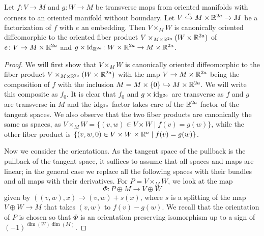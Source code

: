 \begin{lemma}
	Let $f \colon V \to M$ and $g \colon W \to M$ be transverse maps from oriented manifolds with corners to an oriented manifold without boundary.
	Let $V\xhookrightarrow{e}M \times \mathbb{R}^{2a} \to M$ be a factorization of $f$ with $e$ an embedding.
	Then $V \times_M W$ is canonically oriented diffeomorphic to the oriented fiber product $V\times_{M \times \mathbb{R}^{2a}} (W \times \mathbb{R}^{2a})$ of $e \colon V \to M \times \mathbb{R}^{2a}$ and $g \times \mathrm{id}_{\mathbb{R}^{2a}} \colon W \times \mathbb{R}^{2a} \to M \times \mathbb{R}^{2a}$.
\end{lemma}
\begin{proof}
	We will first show that $V \times_M W$ is canonically oriented diffeomorphic to the fiber product $V\times_{M \times \mathbb{R}^{2a}} (W \times \mathbb{R}^{2a})$ with the map $V \to M \times \mathbb{R}^{2a}$ being the composition of $f$ with the inclusion $M = M \times \{0\} \hookrightarrow M \times \mathbb{R}^{2a}$.
	We will write this composite as $f_0$.
	It is clear that $f_0$ and $g \times \mathrm{id}_{\mathbb{R}^{2a}}$ are transverse as $f$ and $g$ are transverse in $M$ and the $\mathrm{id}_{\mathbb{R}^{2a}}$ factor takes care of the $\mathbb{R}^{2a}$ factor of the tangent spaces.
	We also observe that the two fiber products are canonically the same as spaces, as $V \times_M W = \{(v,w) \in V \times W \mid f(v) = g(w)\}$, while the other fiber product is $\{(v,w,0) \in V \times W \times \mathbb{R}^a \mid f(v) = g(w)\}$.

	Now we consider the orientations.
	As the tangent space of the pullback is the pullback of the tangent space, it suffices to assume that all spaces and maps are linear; in the general case we replace all the following spaces with their bundles and all maps with their derivatives.
	For $P = V \times_M W$, we look at the map
	\begin{equation}\label{E: fiber orient}
		\Phi \colon P \oplus M \to V \oplus W
	\end{equation}
	given by $((v,w),x) \to (v,w)+s(x)$, where $s$ is a splitting of the map $V \oplus W \to M$ that takes $(v,w)$ to $f(v)-g(w)$.
	We recall that the orientation of $P$ is chosen so that $\Phi$ is an orientation preserving isomorphism up to a sign of $(-1)^{\dim(W)\dim(M)}$.


\end{proof}
